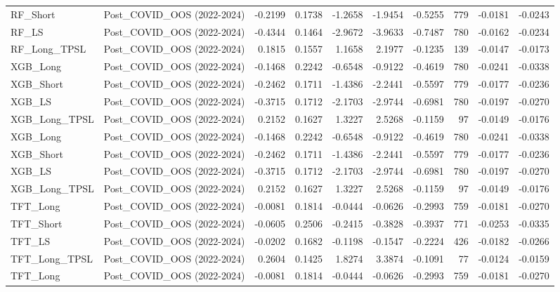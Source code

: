\begin{tabular}{llrrrrrrrr}
\cline{1-10}
RF\_Short & Post\_COVID\_OOS (2022-2024) & -0.2199 & 0.1738 & -1.2658 & -1.9454 & -0.5255 & 779 & -0.0181 & -0.0243 \\
\cline{1-10}
RF\_LS & Post\_COVID\_OOS (2022-2024) & -0.4344 & 0.1464 & -2.9672 & -3.9633 & -0.7487 & 780 & -0.0162 & -0.0234 \\
\cline{1-10}
RF\_Long\_TPSL & Post\_COVID\_OOS (2022-2024) & 0.1815 & 0.1557 & 1.1658 & 2.1977 & -0.1235 & 139 & -0.0147 & -0.0173 \\
\cline{1-10}
XGB\_Long & Post\_COVID\_OOS (2022-2024) & -0.1468 & 0.2242 & -0.6548 & -0.9122 & -0.4619 & 780 & -0.0241 & -0.0338 \\
\cline{1-10}
XGB\_Short & Post\_COVID\_OOS (2022-2024) & -0.2462 & 0.1711 & -1.4386 & -2.2441 & -0.5597 & 779 & -0.0177 & -0.0236 \\
\cline{1-10}
XGB\_LS & Post\_COVID\_OOS (2022-2024) & -0.3715 & 0.1712 & -2.1703 & -2.9744 & -0.6981 & 780 & -0.0197 & -0.0270 \\
\cline{1-10}
XGB\_Long\_TPSL & Post\_COVID\_OOS (2022-2024) & 0.2152 & 0.1627 & 1.3227 & 2.5268 & -0.1159 & 97 & -0.0149 & -0.0176 \\
\cline{1-10}
XGB\_Long & Post\_COVID\_OOS (2022-2024) & -0.1468 & 0.2242 & -0.6548 & -0.9122 & -0.4619 & 780 & -0.0241 & -0.0338 \\
\cline{1-10}
XGB\_Short & Post\_COVID\_OOS (2022-2024) & -0.2462 & 0.1711 & -1.4386 & -2.2441 & -0.5597 & 779 & -0.0177 & -0.0236 \\
\cline{1-10}
XGB\_LS & Post\_COVID\_OOS (2022-2024) & -0.3715 & 0.1712 & -2.1703 & -2.9744 & -0.6981 & 780 & -0.0197 & -0.0270 \\
\cline{1-10}
XGB\_Long\_TPSL & Post\_COVID\_OOS (2022-2024) & 0.2152 & 0.1627 & 1.3227 & 2.5268 & -0.1159 & 97 & -0.0149 & -0.0176 \\
\cline{1-10}
TFT\_Long & Post\_COVID\_OOS (2022-2024) & -0.0081 & 0.1814 & -0.0444 & -0.0626 & -0.2993 & 759 & -0.0181 & -0.0270 \\
\cline{1-10}
TFT\_Short & Post\_COVID\_OOS (2022-2024) & -0.0605 & 0.2506 & -0.2415 & -0.3828 & -0.3937 & 771 & -0.0253 & -0.0335 \\
\cline{1-10}
TFT\_LS & Post\_COVID\_OOS (2022-2024) & -0.0202 & 0.1682 & -0.1198 & -0.1547 & -0.2224 & 426 & -0.0182 & -0.0266 \\
\cline{1-10}
TFT\_Long\_TPSL & Post\_COVID\_OOS (2022-2024) & 0.2604 & 0.1425 & 1.8274 & 3.3874 & -0.1091 & 77 & -0.0124 & -0.0159 \\
\cline{1-10}
TFT\_Long & Post\_COVID\_OOS (2022-2024) & -0.0081 & 0.1814 & -0.0444 & -0.0626 & -0.2993 & 759 & -0.0181 & -0.0270 \\

\end{tabular}
